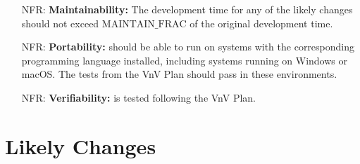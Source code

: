 \documentclass[12pt]{article}
\newcounter{nfrnum} %
\begin{document}
\begin{itemize}
  \item[NFR\refstepcounter{nfrnum}\thenfrnum \label{NFR_maintainability}:]
    \textbf{Maintainability:} The development time for any of the likely
    changes should not exceed $\text{MAINTAIN\_FRAC}$ of the original
    development time.

  \item[NFR\refstepcounter{nfrnum}\thenfrnum \label{NFR_portability}:]
    \textbf{Portability:} \progname{} should be able to run on systems with the
    corresponding programming language
    installed, including systems running on Windows or macOS. The tests from
    the VnV Plan should pass in these environments.

  \item[NFR\refstepcounter{nfrnum}\thenfrnum \label{NFR_verifiability}:]
    \textbf{Verifiability:} \progname{} is tested following the VnV Plan.


\end{itemize}

\newpage

\section{Likely Changes} \label{sec_LCs}
\end{document}

